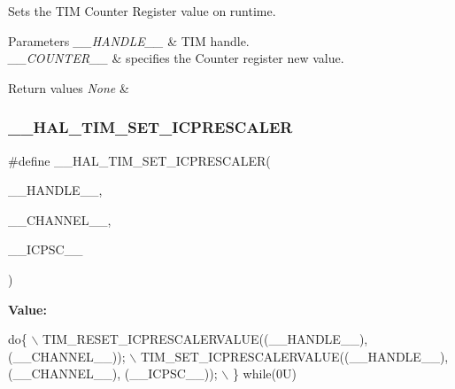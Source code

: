 Sets the T\+IM Counter Register value on runtime. 


\begin{DoxyParams}{Parameters}
{\em \+\_\+\+\_\+\+H\+A\+N\+D\+L\+E\+\_\+\+\_\+} & T\+IM handle. \\
\hline
{\em \+\_\+\+\_\+\+C\+O\+U\+N\+T\+E\+R\+\_\+\+\_\+} & specifies the Counter register new value. \\
\hline
\end{DoxyParams}

\begin{DoxyRetVals}{Return values}
{\em None} & \\
\hline
\end{DoxyRetVals}
\mbox{\label{group___t_i_m___exported___macros_gaeb106399b95ef02cec502f58276a0e92}} 
\subsubsection{\texorpdfstring{\+\_\+\+\_\+\+H\+A\+L\+\_\+\+T\+I\+M\+\_\+\+S\+E\+T\+\_\+\+I\+C\+P\+R\+E\+S\+C\+A\+L\+ER}{\_\_HAL\_TIM\_SET\_ICPRESCALER}}
{\footnotesize\ttfamily \#define \+\_\+\+\_\+\+H\+A\+L\+\_\+\+T\+I\+M\+\_\+\+S\+E\+T\+\_\+\+I\+C\+P\+R\+E\+S\+C\+A\+L\+ER(\begin{DoxyParamCaption}\item[{}]{\+\_\+\+\_\+\+H\+A\+N\+D\+L\+E\+\_\+\+\_\+,  }\item[{}]{\+\_\+\+\_\+\+C\+H\+A\+N\+N\+E\+L\+\_\+\+\_\+,  }\item[{}]{\+\_\+\+\_\+\+I\+C\+P\+S\+C\+\_\+\+\_\+ }\end{DoxyParamCaption})}

{\bfseries Value\+:}
\begin{DoxyCode}
\textcolor{keywordflow}{do}\{                                                    \(\backslash\)
                              TIM\_RESET\_ICPRESCALERVALUE((\_\_HANDLE\_\_), (\_\_CHANNEL\_\_));  \(\backslash\)
                              TIM\_SET\_ICPRESCALERVALUE((\_\_HANDLE\_\_), (\_\_CHANNEL\_\_), (\_\_ICPSC\_\_)); \(\backslash\)
                          \} \textcolor{keywordflow}{while}(0U)
\end{DoxyCode}


